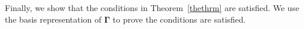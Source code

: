 \documentclass[12pt,letterpaper]{article}
\begin{document}
Finally, we show that the conditions in Theorem~\ref{thethrm} are satisfied. We use the basis representation of $\boldsymbol{\Gamma}$ to prove the conditions are satisfied.
\end{document}
